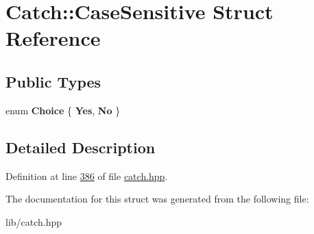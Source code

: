 \hypertarget{structCatch_1_1CaseSensitive}{}\section{Catch\+::Case\+Sensitive Struct Reference}
\label{structCatch_1_1CaseSensitive}
\subsection*{Public Types}
\begin{DoxyCompactItemize}
\item 
\mbox{\label{structCatch_1_1CaseSensitive_aad49d3aee2d97066642fffa919685c6a}} 
enum {\bfseries Choice} \{ {\bfseries Yes}, 
{\bfseries No}
 \}
\end{DoxyCompactItemize}


\subsection{Detailed Description}


Definition at line \mbox{\hyperlink{catch_8hpp_source_l00386}{386}} of file \mbox{\hyperlink{catch_8hpp_source}{catch.\+hpp}}.



The documentation for this struct was generated from the following file\+:\begin{DoxyCompactItemize}
\item 
lib/catch.\+hpp\end{DoxyCompactItemize}
